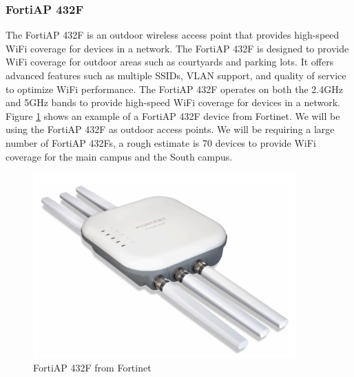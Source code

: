 \documentclass[12pt]{report}
\begin{document}
\subsubsection{FortiAP 432F}
The FortiAP 432F is an outdoor wireless access point that provides high-speed WiFi coverage for devices in a network. The FortiAP 432F is designed to provide WiFi coverage for outdoor areas such as courtyards and parking lots. It offers advanced features such as multiple SSIDs, VLAN support, and quality of service to optimize WiFi performance. The FortiAP 432F operates on both the 2.4GHz and 5GHz bands to provide high-speed WiFi coverage for devices in a network.\cite{FAPList} Figure \ref{fig:432F} shows an example of a FortiAP 432F device from Fortinet. We will be using the FortiAP 432F as outdoor access points. We will be requiring a large number of FortiAP 432Fs, a rough estimate is 70 devices to provide WiFi coverage for the main campus and the South campus.
\begin{figure}[h]
    \centering
    \includegraphics[width=0.9\textwidth]{images/432F.png}
    \caption{FortiAP 432F from Fortinet \cite{FAP432FIMG}}
    \label{fig:432F}
\end{figure}
\newpage
\end{document}

